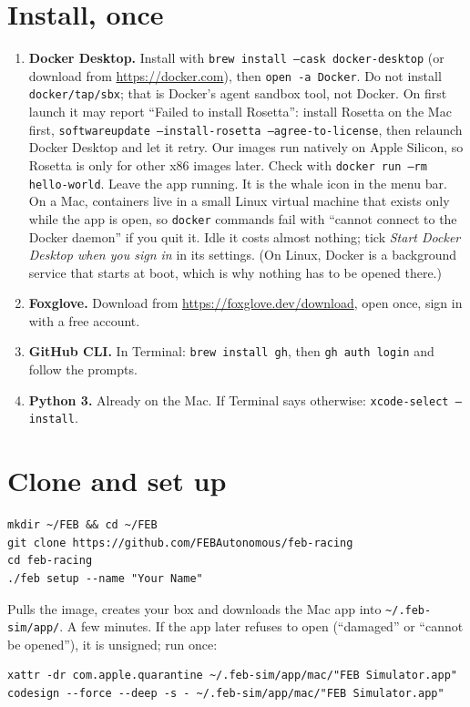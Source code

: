
\section{Install, once}

\begin{enumerate}
  \item \textbf{Docker Desktop.} Install with \texttt{brew install --cask docker-desktop} (or download
  from \url{https://docker.com}), then \texttt{open -a Docker}. Do not install \texttt{docker/tap/sbx};
  that is Docker's agent sandbox tool, not Docker. On first launch it may report ``Failed to install
  Rosetta'': install Rosetta on the Mac first, \texttt{softwareupdate --install-rosetta
  --agree-to-license}, then relaunch Docker Desktop and let it retry. Our images run natively on Apple
  Silicon, so Rosetta is only for other x86 images later. Check with \texttt{docker run --rm hello-world}.
  Leave the app running.
  It is the whale icon in the menu bar. On a Mac, containers live in a small Linux virtual machine
  that exists only while the app is open, so \texttt{docker} commands fail with ``cannot connect to
  the Docker daemon'' if you quit it. Idle it costs almost nothing; tick \emph{Start Docker Desktop
  when you sign in} in its settings. (On Linux, Docker is a background service that starts at boot,
  which is why nothing has to be opened there.)
  \item \textbf{Foxglove.} Download from \url{https://foxglove.dev/download}, open once, sign in with a free account.
  \item \textbf{GitHub CLI.} In Terminal: \texttt{brew install gh}, then \texttt{gh auth login} and follow the prompts.
  \item \textbf{Python 3.} Already on the Mac. If Terminal says otherwise: \texttt{xcode-select --install}.
\end{enumerate}

\section{Clone and set up}

\begin{lstlisting}
mkdir ~/FEB && cd ~/FEB
git clone https://github.com/FEBAutonomous/feb-racing
cd feb-racing
./feb setup --name "Your Name"
\end{lstlisting}

Pulls the image, creates your box and downloads the Mac app into \texttt{\textasciitilde/.feb-sim/app/}.
A few minutes. If the app later refuses to open (``damaged'' or ``cannot be opened''), it is
unsigned; run once:

\begin{lstlisting}
xattr -dr com.apple.quarantine ~/.feb-sim/app/mac/"FEB Simulator.app"
codesign --force --deep -s - ~/.feb-sim/app/mac/"FEB Simulator.app"
\end{lstlisting}

